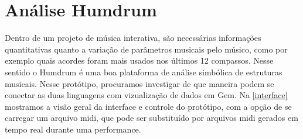 \documentclass[draft]{ppgmus}
\begin{document}
% 
% 
% 
% 
% 
% 


\pagebreak 



\section{Análise Humdrum}

  Dentro de um projeto de música interativa, são necessárias informações quantitativas quanto a 
variação de parâmetros musicais pelo músico, como por exemplo quais acordes foram mais usados 
nos últimos 12 compassos.
Nesse sentido o Humdrum é uma boa plataforma de análise simbólica de estruturas musicais. 
Nesse protótipo, procuramos investigar de que maneira podem se conectar as duas linguagens 
com vizualização de dados em Gem.
Na \ref{interface} mostramos a visão geral da interface e controle
do protótipo, com a opção de se carregar um arquivo midi, 
que pode ser substituído por arquivos midi gerados em tempo real 
durante uma performance.

\end{document}
